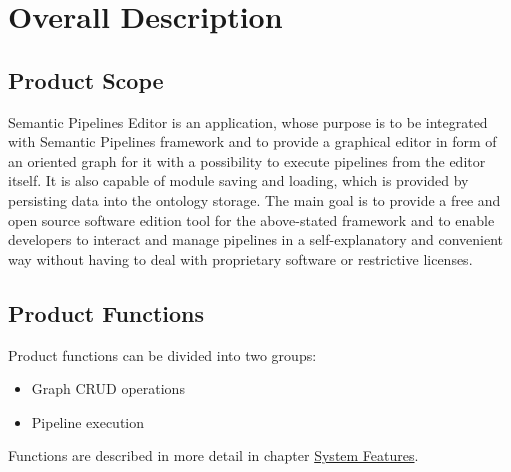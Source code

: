 \documentclass{article}
\begin{document}
\section{Overall Description}
\subsection{Product Scope}
Semantic Pipelines Editor is an application, whose purpose is to be integrated with Semantic Pipelines framework and to provide a graphical editor in form of an oriented graph for it with a possibility to execute pipelines from the editor itself. It is also capable of module saving and loading, which is provided by persisting data into the ontology storage. The main goal is to provide a free and open source software edition tool for the above-stated framework and to enable developers to interact and manage pipelines in a self-explanatory and convenient way without having to deal with proprietary software or restrictive licenses.
\subsection{Product Functions}
Product functions can be divided into two groups:
\begin{itemize}
    \item Graph CRUD operations
    \item Pipeline execution
\end{itemize}
Functions are described in more detail in chapter \hyperref[sec:features]{System Features}.
\end{document}
